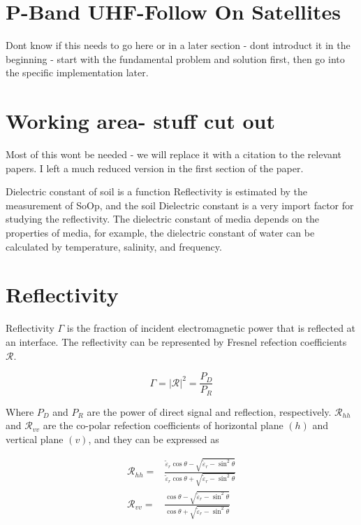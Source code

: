\documentclass[draftcls,onecolumn]{IEEEtran}  %
\begin{document}
\appendices
\section{P-Band UHF-Follow On Satellites}

Dont know if this needs to go here or in a later section - dont introduct it in the beginning - start with the fundamental problem and solution first, then go into the specific implementation later. 




\section{Working area- stuff cut out}

Most of this wont be needed - we will replace it with a citation to the relevant papers. I left a much reduced version in the first section of the paper. 

Dielectric constant of soil is a function Reflectivity is estimated by the measurement of SoOp, and the soil Dielectric constant is a very import factor for studying the reflectivity. The dielectric constant of media depends on the properties of media, for example, the dielectric constant of water can be calculated by temperature, salinity, and frequency.
\section{Reflectivity}

Reflectivity $\Gamma$ is the fraction of incident electromagnetic power that is reflected at an interface. The reflectivity can be represented by Fresnel refection coefficients $\mathcal{R}$.

\begin{equation}
\Gamma = |\mathcal{R}|^2=\frac{P_D}{P_R}
\end{equation}

Where $P_D$ and $P_R$ are the power of direct signal and reflection, respectively. $\mathcal{R}_{hh}$ and $\mathcal{R}_{vv}$ are the co-polar refection coefficients of horizontal plane $(h)$ and vertical plane $(v)$, and they can be expressed as

\begin{equation} 
\begin{split}
	{\mathcal{R}_{hh}} = {}& \frac{{{{\tilde \varepsilon }_r}\cos \theta  - \sqrt 				{{{\tilde \varepsilon }_r} - {{\sin }^2}\theta } }}{{{{\tilde \varepsilon}_r}				\cos \theta  + \sqrt {{{\tilde \varepsilon }_r} - {{\sin }^2}\theta }}}
\\
	{\mathcal{R}_{vv}} = {}& \frac{{\cos \theta  - \sqrt {{{\tilde \varepsilon }_r} - {{\sin }^2}\theta } }}{{\cos \theta  + \sqrt {{{\tilde \varepsilon }_r} - {{\sin }^2}\theta }}} 
    \end{split}
     \label{Eq: reflectivity_di}
\end{equation}
\end{document}
